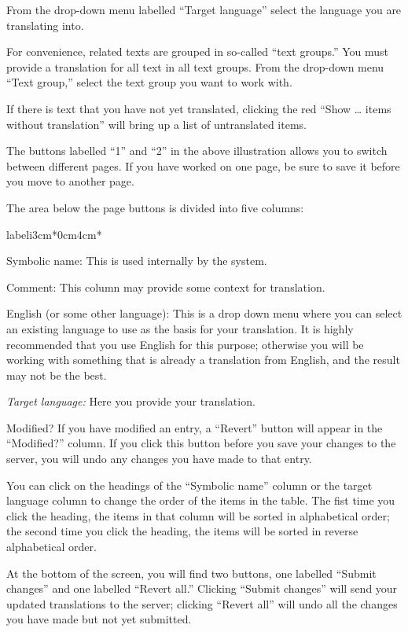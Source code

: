 \documentclass[11pt,oneside,a4paper]{memoir}
\begin{document}
From the drop-down menu labelled ``Target language'' select the language you are translating into.

For convenience, related texts are grouped in so-called ``text groups.'' You must provide a
translation for all text in all text groups. From the drop-down menu ``Text group,'' select the text
group you want to work with.

If there is text that you have not yet translated, clicking the red ``Show \ldots{} items without
translation'' will bring up a list of untranslated items.

The buttons labelled ``1'' and ``2'' in the above illustration allows you to switch between different
pages. If you have worked on one page, be sure to save it before you move to another page.

The area below the page buttons is divided into five columns:


\newcommand*{\labeli}[1]{\normalfont\bfseries #1}

\begin{flexlabelled}{labeli}{3cm}{*}{0cm}{4cm}{*}
\item[Symbolic name:\hfill] This is used internally by the system.
\item[Comment:] This column may provide some context for translation.
\item[English (or some other language):] This is a drop down menu where you can select an existing
  language to use as the basis for your translation. It is highly recommended that you use English
  for this purpose; otherwise you will be working with something that is already a translation
  from English, and the result may not be the best.
\item[\emph{Target language:}\hfill]  Here you provide your translation.
\item[Modified?] If you have modified an entry, a ``Revert'' button will appear in the ``Modified?''
  column. If you click this button before you save your changes to the server, you will undo any
  changes you have made to that entry.
\end{flexlabelled}

You can click on the headings of the ``Symbolic name'' column or the target language column to change
the order of the items in the table. The fist time you click the heading, the items in that column
will be sorted in alphabetical order; the second time you click the heading, the items will be sorted
in reverse alphabetical order.

At the bottom of the screen, you will find two buttons, one labelled ``Submit changes'' and one
labelled ``Revert all.'' Clicking ``Submit changes'' will send your updated translations to the server;
clicking ``Revert all'' will undo all the changes you have made but not yet submitted.
\end{document}
